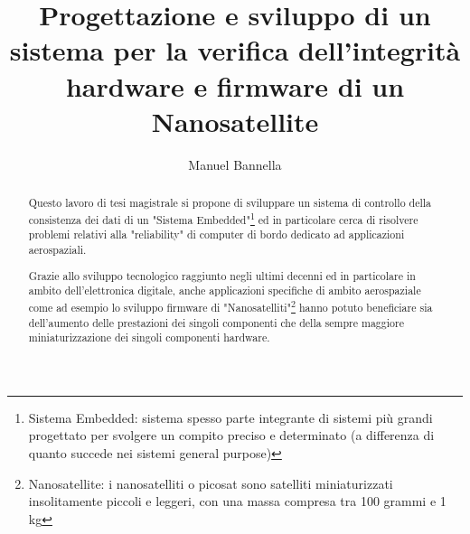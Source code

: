 \documentclass[LaM,binding=0.6cm,oneside]{../sapthesis}
\title{Progettazione e sviluppo di un sistema per la verifica
dell’integrità hardware e
firmware di un Nanosatellite}
\author{Manuel Bannella}
\begin{document}
\frontmatter

\maketitle

\dedication{Dedicato a\\ Francesco Savi}

\begin{abstract}


Questo lavoro di tesi magistrale si propone di sviluppare un sistema di controllo della consistenza dei dati di un "Sistema Embedded"\footnote{Sistema Embedded: sistema spesso parte integrante di sistemi più grandi progettato per svolgere un compito preciso e determinato (a differenza di quanto succede nei sistemi general purpose)} ed in particolare cerca di risolvere problemi relativi alla "reliability" di computer di bordo dedicato ad applicazioni aerospaziali.

Grazie allo sviluppo tecnologico raggiunto negli ultimi decenni ed in particolare in ambito dell'elettronica digitale, anche applicazioni specifiche di ambito aerospaziale come ad esempio lo sviluppo firmware di "Nanosatelliti"\footnote{Nanosatellite: i nanosatelliti o picosat sono satelliti miniaturizzati insolitamente piccoli e leggeri, con una massa compresa tra 100 grammi e 1 kg} hanno potuto beneficiare sia dell'aumento delle prestazioni dei singoli componenti che della sempre maggiore miniaturizzazione dei singoli componenti hardware. 


\end{abstract}
\end{document}
